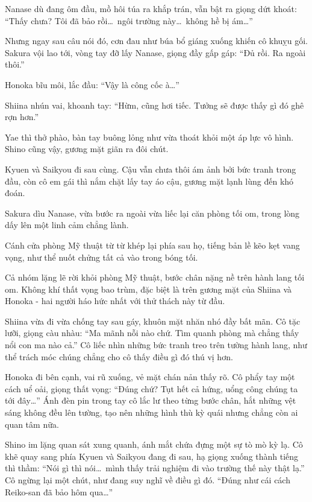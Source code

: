 \documentclass[../main.tex]{subfiles}
\begin{document}
Nanase dù đang ôm đầu, mồ hôi túa ra khắp trán, vẫn bật ra giọng dứt khoát: ``Thấy chưa? Tôi đã bảo rồi\dots\ ngôi trường này\dots\ không hề bị ám\dots''

Nhưng ngay sau câu nói đó, cơn đau như búa bổ giáng xuống khiến cô khuỵu gối. Sakura vội lao tới, vòng tay đỡ lấy Nanase, giọng đầy gấp gáp: ``Đủ rồi. Ra ngoài thôi.''

Honoka bĩu môi, lắc đầu: ``Vậy là công cốc à\dots''

Shiina nhún vai, khoanh tay: ``Hừm, cũng hơi tiếc. Tưởng sẽ được thấy gì đó ghê rợn hơn.''

Yae thì thở phào, bàn tay buông lỏng như vừa thoát khỏi một áp lực vô hình. Shino cũng vậy, gương mặt giãn ra đôi chút.

Kyuen và Saikyou đi sau cùng. Cậu vẫn chưa thôi ám ảnh bởi bức tranh trong đầu, còn cô em gái thì nắm chặt lấy tay áo cậu, gương mặt lạnh lùng đến khó đoán.

Sakura dìu Nanase, vừa bước ra ngoài vừa liếc lại căn phòng tối om, trong lòng dấy lên một linh cảm chẳng lành.

Cánh cửa phòng Mỹ thuật từ từ khép lại phía sau họ, tiếng bản lề kẽo kẹt vang vọng, như thể nuốt chửng tất cả vào trong bóng tối.

\ct

Cả nhóm lặng lẽ rời khỏi phòng Mỹ thuật, bước chân nặng nề trên hành lang tối om. Không khí thất vọng bao trùm, đặc biệt là trên gương mặt của Shiina và Honoka - hai người háo hức nhất với thử thách này từ đầu.


Shiina vừa đi vừa chống tay sau gáy, khuôn mặt nhăn nhó đầy bất mãn. Cô tặc lưỡi, giọng càu nhàu: ``Ma mãnh nỗi nào chứ. Tìm quanh phòng mà chẳng thấy nổi con ma nào cả.'' Cô liếc nhìn những bức tranh treo trên tường hành lang, như thể trách móc chúng chẳng cho cô thấy điều gì đó thú vị hơn.

Honoka đi bên cạnh, vai rũ xuống, vẻ mặt chán nản thấy rõ. Cô phẩy tay một cách uể oải, giọng thất vọng: ``Đúng chứ? Tụt hết cả hứng, uổng công chúng ta tới đây\dots'' Ánh đèn pin trong tay cô lắc lư theo từng bước chân, hắt những vệt sáng không đều lên tường, tạo nên những hình thù kỳ quái nhưng chẳng còn ai quan tâm nữa.

Shino im lặng quan sát xung quanh, ánh mắt chứa đựng một sự tò mò kỳ lạ. Cô khẽ quay sang phía Kyuen và Saikyou đang đi sau, hạ giọng xuống thành tiếng thì thầm: ``Nói gì thì nói\dots\ mình thấy trải nghiệm đi vào trường thế này thật lạ.'' Cô ngừng lại một chút, như đang suy nghĩ về điều gì đó. ``Đúng như cái cách Reiko-san đã bảo hôm qua\dots''
\end{document}
